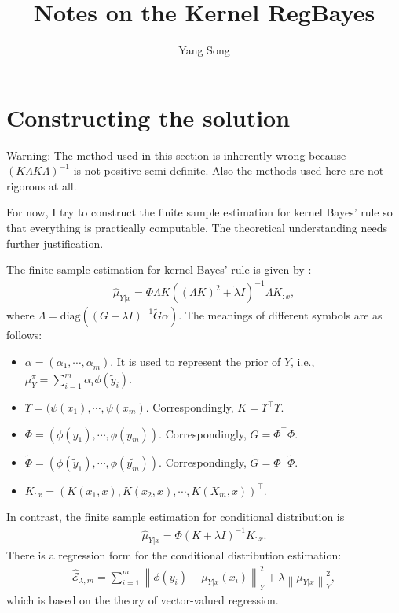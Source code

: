 \documentclass[a4paper]{article}
\title{Notes on the Kernel RegBayes}
\author{Yang Song}
\date{}
\newcommand{\up}{\mathrm}
\newcommand{\norm}[1]{\left\lVert#1\right\rVert}
\begin{document}
\maketitle
\section{Constructing the solution}
{\color{red}Warning: The method used in this section is inherently wrong because $(K\Lambda K\Lambda)^{-1}$ is not positive semi-definite. Also the methods used here are not rigorous at all.}

 For now, I try to construct the finite sample estimation for kernel Bayes' rule so that everything is practically computable. The theoretical understanding needs further justification.

The finite sample estimation for kernel Bayes' rule is given by \cite{song2013kernel}:
\begin{align}
\widehat{\mu}_{Y|x} = \Phi \Lambda K((\Lambda K)^2 + \tilde{\lambda} I)^{-1} \Lambda K_{:x} \label{eqn:f1},
\end{align}
where $\Lambda = \up{diag}((G+\lambda I)^{-1}\tilde{G}\alpha)$. The meanings of different symbols are as follows:
\begin{itemize}
\item $\alpha = (\alpha_1,\cdots,\alpha_{\tilde{m}})$. It is used to represent the prior of $Y$, i.e., $\mu_{Y}^{\pi} = \sum_{i=1}^{\tilde{m}} \alpha_i \phi(\tilde{y}_i)$.
\item $\Upsilon = (\psi(x_1),\cdots,\psi(x_m)$. Correspondingly, $K = \Upsilon^\intercal \Upsilon$.
\item $\Phi = (\phi(y_1),\cdots,\phi(y_m))$. Correspondingly, $G = \Phi^\intercal \Phi$.
\item $\tilde{\Phi} = (\phi(\tilde{y}_1),\cdots,\phi(\tilde{y_m}))$. Correspondingly, $\tilde{G} = \Phi^\intercal \tilde{\Phi}$.
\item $K_{:x} = (K(x_1,x),K(x_2,x),\cdots,K(X_m,x))^\intercal$.
\end{itemize}

In contrast, the finite sample estimation for conditional distribution is
\begin{align}
\widehat{\mu}_{Y|x} = \Phi (K+\lambda I)^{-1} K_{:x}.
\end{align}
There is a regression form for the conditional distribution estimation:
\begin{align}
\widehat{\mathcal{E}}_{\lambda,m} = \sum_{i=1}^m \norm{\phi(y_i) - \mu_{Y|x}(x_i)}_Y^2 + \lambda \norm{\mu_{Y|x}}_Y^2,
\end{align}
which is based on the theory of vector-valued regression.
\end{document}
